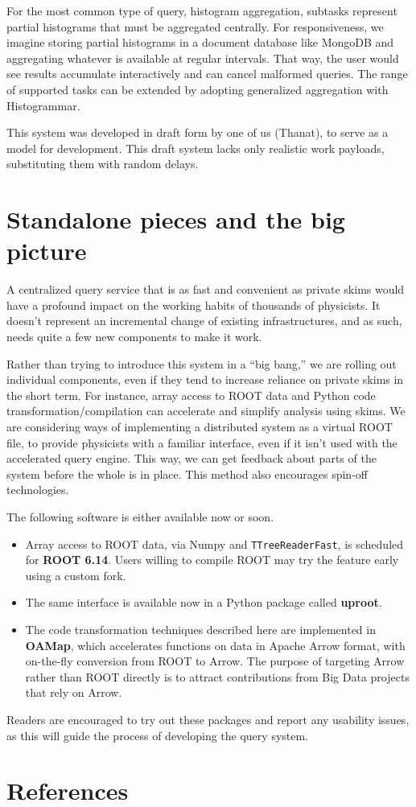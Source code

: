 \documentclass[a4paper]{jpconf}
\begin{document}
For the most common type of query, histogram aggregation, subtasks represent partial histograms that must be aggregated centrally. For responsiveness, we imagine storing partial histograms in a document database like MongoDB and aggregating whatever is available at regular intervals. That way, the user would see results accumulate interactively and can cancel malformed queries. The range of supported tasks can be extended by adopting generalized aggregation with Histogrammar\cite{histogrammar}.

This system was developed in draft form by one of us (Thanat)\cite{thanat}, to serve as a model for development. This draft system lacks only realistic work payloads, substituting them with random delays.

\section{Standalone pieces and the big picture}

A centralized query service that is as fast and convenient as private skims would have a profound impact on the working habits of thousands of physicists. It doesn't represent an incremental change of existing infrastructures, and as such, needs quite a few new components to make it work.

Rather than trying to introduce this system in a ``big bang,'' we are rolling out individual components, even if they tend to increase reliance on private skims in the short term. For instance, array access to ROOT data and Python code transformation/compilation can accelerate and simplify analysis using skims. We are considering ways of implementing a distributed system as a virtual ROOT file, to provide physicists with a familiar interface, even if it isn't used with the accelerated query engine. This way, we can get feedback about parts of the system before the whole is in place. This method also encourages spin-off technologies.

The following software is either available now or soon.
\begin{itemize}
\item Array access to ROOT data, via Numpy and {\tt TTreeReaderFast}, is scheduled for {\bf ROOT 6.14}\cite{root}. Users willing to compile ROOT may try the feature early using a custom fork\cite{root-brian}.
\item The same interface is available now in a Python package called {\bf uproot}\cite{uproot}.
\item The code transformation techniques described here are implemented in {\bf OAMap}\cite{oamap}, which accelerates functions on data in Apache Arrow\cite{arrow} format, with on-the-fly conversion from ROOT to Arrow. The purpose of targeting Arrow rather than ROOT directly is to attract contributions from Big Data projects that rely on Arrow.
\end{itemize}

Readers are encouraged to try out these packages and report any usability issues, as this will guide the process of developing the query system.

\section*{References}



\end{document}
